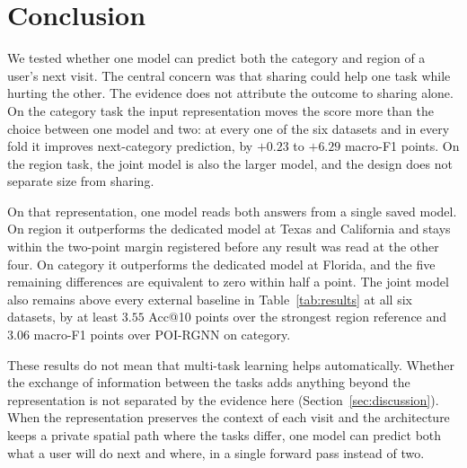 \section{Conclusion}
\label{sec:conclusion}

We tested whether one model can predict both the category and region of a user's next visit. The
central concern was that sharing could help one task while hurting the other. The evidence does not
attribute the outcome to sharing alone. On the category task the input representation moves the
score more than the choice between one model and two: at every one of the six datasets and in every
fold it improves next-category prediction, by $+0.23$ to $+6.29$ macro-F1 points. On the region task, the joint model is also the larger model, and the design does not separate
size from sharing.

On that representation, one model reads both answers from a single saved model. On region it
outperforms the dedicated model at Texas and California and stays within the two-point margin registered before any result was read at the
other four. On category it outperforms the dedicated model at Florida, and the five remaining
differences are equivalent to zero within half a point. The joint model also remains above every
external baseline in Table~\ref{tab:results} at all six datasets, by at least $3.55$ Acc@10 points
over the strongest region reference and $3.06$ macro-F1 points over POI-RGNN on category.

These results do not mean that multi-task learning helps automatically. Whether the exchange of information between the tasks adds anything beyond the representation is
not separated by the evidence here (Section~\ref{sec:discussion}). When the representation preserves the context of
each visit and the architecture keeps a private spatial path where the tasks differ, one model can
predict both what a user will do next and where, in a single forward pass instead of two.
